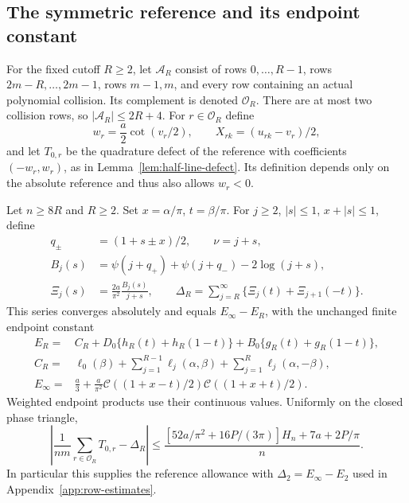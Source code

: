 \subsection{The symmetric reference and its endpoint constant}

For the fixed cutoff $R\geq2$, let $\mathcal A_R$ consist of
rows $0,\ldots,R-1$, rows $2m-R,\ldots,2m-1$, rows $m-1,m$,
and every row containing an actual polynomial collision.  Its complement
is denoted $\mathcal O_R$.  There are at most two collision rows, so
$|\mathcal A_R|\leq2R+4$.  For $r\in\mathcal O_R$ define
\[
 w_r=\frac a2\cot(v_r/2),\qquad
 X_{rk}=(u_{rk}-v_r)/2,
\]
and let $T_{0,r}$ be the quadrature defect of the reference with
coefficients $(-w_r,w_r)$, as in
Lemma~\ref{lem:half-line-defect}.  Its definition depends only on
the absolute reference and thus also allows $w_r<0$.

\begin{lemma}
\label{lem:symmetric-reference-match}
Let $n\geq8R$ and $R\geq2$.  Set $x=\alpha/\pi$, $t=\beta/\pi$.
For $j\geq2$, $|s|\leq1$, $x+|s|\leq1$, define
\begin{align*}
 q_\pm&=(1+s\pm x)/2,\qquad \nu=j+s,\\
 B_j(s)&=\psi(j+q_+)+\psi(j+q_-)-2\log(j+s),\\
 \Xi_j(s)&=\frac{2a}{\pi^2}\frac{B_j(s)}{j+s},\qquad
 \Delta_R=\sum_{j=R}^{\infty}\{\Xi_j(t)+\Xi_{j+1}(-t)\}.
\end{align*}
This series converges absolutely and equals $E_\infty-E_R$, with
the unchanged finite endpoint constant
\begin{align*}
 E_R={}&C_R+D_0\{h_R(t)+h_R(1-t)\}
                  +B_0\{g_R(t)+g_R(1-t)\},\\
 C_R={}&\ell_0(\beta)+\sum_{j=1}^{R-1}\ell_j(\alpha,\beta)
                         +\sum_{j=1}^{R}\ell_j(\alpha,-\beta),\\
 E_\infty={}&\frac a3+
       \frac a{\pi^2}\mathcal C((1+x-t)/2)\mathcal C((1+x+t)/2).
\end{align*}
Weighted endpoint products use their continuous values.  Uniformly on
the closed phase triangle,
\begin{equation}\label{eq:pole-symmetric-match}
 \left|\frac1{nm}\sum_{r\in\mathcal O_R}T_{0,r}-\Delta_R\right|
 \leq\frac{[52a/\pi^2+16P/(3\pi)]H_n+7a+2P/\pi}{n}.
\end{equation}
In particular this supplies the reference allowance with
$\Delta_2=E_\infty-E_2$ used in Appendix~\ref{app:row-estimates}.
\end{lemma}

